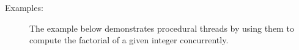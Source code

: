 \documentclass[\pformat,12pt]{article}
\begin{document}
\begin{description}
%
%
%
\item[Examples:]  \mbox{}
The example below demonstrates procedural threads by using them to
compute the factorial of a given integer concurrently. 


\end{description}
\end{document}
